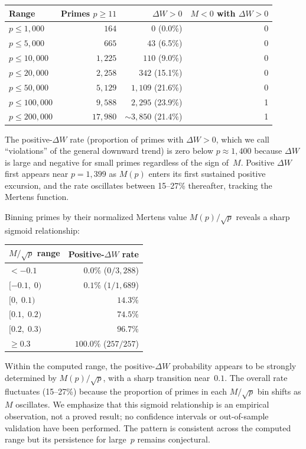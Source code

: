 \documentclass[11pt]{article}
\theoremstyle{definition}
\begin{document}
\begin{center}
\begin{tabular}{lrrr}
\toprule
Range & Primes $p \ge 11$ & $\Delta W > 0$ & $M < 0$ with $\Delta W > 0$ \\
\midrule
$p \le 1{,}000$ & $164$ & $0$ (0.0\%) & 0 \\
$p \le 5{,}000$ & $665$ & $43$ (6.5\%) & 0 \\
$p \le 10{,}000$ & $1{,}225$ & $110$ (9.0\%) & 0 \\
$p \le 20{,}000$ & $2{,}258$ & $342$ (15.1\%) & 0 \\
$p \le 50{,}000$ & $5{,}129$ & $1{,}109$ (21.6\%) & 0 \\
$p \le 100{,}000$ & $9{,}588$ & $2{,}295$ (23.9\%) & 1 \\
$p \le 200{,}000$ & $17{,}980$ & ${\sim}3{,}850$ (21.4\%) & 1 \\
\bottomrule
\end{tabular}
\end{center}

\noindent The positive-$\Delta W$ rate (proportion of primes with
$\Delta W > 0$, which we call ``violations'' of the general
downward trend) is zero below $p \approx 1{,}400$ because
$\Delta W$ is large and negative for small primes regardless
of the sign of~$M$.  Positive $\Delta W$ first appears near
$p = 1{,}399$ as $M(p)$ enters
its first sustained positive excursion, and the rate oscillates
between 15--27\% thereafter, tracking the Mertens function.

Binning primes by their normalized Mertens value $M(p)/\sqrt{p}$
reveals a sharp sigmoid relationship:

\begin{center}
\begin{tabular}{lr}
\toprule
$M/\sqrt{p}$ range & Positive-$\Delta W$ rate \\
\midrule
$< -0.1$ & $0.0\%$ ($0/3{,}288$) \\
$[-0.1, \; 0)$ & $0.1\%$ ($1/1{,}689$) \\
$[0, \; 0.1)$ & $14.3\%$ \\
$[0.1, \; 0.2)$ & $74.5\%$ \\
$[0.2, \; 0.3)$ & $96.7\%$ \\
$\ge 0.3$ & $100.0\%$ ($257/257$) \\
\bottomrule
\end{tabular}
\end{center}

\noindent Within the computed range, the positive-$\Delta W$
probability appears to be strongly determined by
$M(p)/\sqrt{p}$, with a sharp transition near~$0.1$.
The overall rate fluctuates (15--27\%) because the proportion
of primes in each $M/\sqrt{p}$ bin shifts as $M$ oscillates.
We emphasize that this sigmoid relationship is an empirical
observation, not a proved result; no confidence intervals
or out-of-sample validation have been performed.  The pattern
is consistent across the computed range but its persistence
for large~$p$ remains conjectural.
\end{document}
